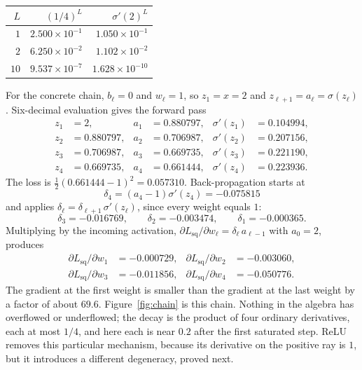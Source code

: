 \begin{center}
\label{tab:powers}
\vspace{0.4em}
\begin{tabular}{@{}rrr@{}}
\toprule
\(L\) & \((1/4)^L\) & \(\sigma'(2)^L\) \\
\midrule
\(1\)  & \(2.500\times 10^{-1}\) & \(1.050\times 10^{-1}\) \\
\(2\)  & \(6.250\times 10^{-2}\) & \(1.102\times 10^{-2}\) \\
\(10\) & \(9.537\times 10^{-7}\) & \(1.628\times 10^{-10}\) \\
\bottomrule
\end{tabular}
\end{center}

For the concrete chain, \(b_\ell=0\) and \(w_\ell=1\), so \(z_1=x=2\) and \(z_{\ell+1}=a_\ell=\sigma(z_\ell)\). Six-decimal evaluation gives the forward pass
\begin{align*}
  z_1 &= 2,        & a_1 &= 0.880797, & \sigma'(z_1) &= 0.104994,\\
  z_2 &= 0.880797, & a_2 &= 0.706987, & \sigma'(z_2) &= 0.207156,\\
  z_3 &= 0.706987, & a_3 &= 0.669735, & \sigma'(z_3) &= 0.221190,\\
  z_4 &= 0.669735, & a_4 &= 0.661444, & \sigma'(z_4) &= 0.223936.
\end{align*}
The loss is \(\tfrac12(0.661444-1)^2 = 0.057310\). Back-propagation starts at
\[
  \delta_4 = (a_4-1)\sigma'(z_4) = -0.075815
\]
and applies \(\delta_\ell = \delta_{\ell+1}\,\sigma'(z_\ell)\), since every weight equals \(1\):
\[
  \delta_3 = -0.016769,
  \qquad
  \delta_2 = -0.003474,
  \qquad
  \delta_1 = -0.000365.
\]
Multiplying by the incoming activation, \(\partial L_{\mathrm{sq}}/\partial w_\ell = \delta_\ell\, a_{\ell-1}\) with \(a_0=2\), produces
\begin{equation*}
\begin{aligned}
  \partial L_{\mathrm{sq}}/\partial w_1 &= -0.000729, &
  \partial L_{\mathrm{sq}}/\partial w_2 &= -0.003060,\\
  \partial L_{\mathrm{sq}}/\partial w_3 &= -0.011856, &
  \partial L_{\mathrm{sq}}/\partial w_4 &= -0.050776.
\end{aligned}
\end{equation*}
The gradient at the first weight is smaller than the gradient at the last weight by a factor of about \(69.6\). Figure~\ref{fig:chain} is this chain. Nothing in the algebra has overflowed or underflowed; the decay is the product of four ordinary derivatives, each at most \(1/4\), and here each is near \(0.2\) after the first saturated step. ReLU removes this particular mechanism, because its derivative on the positive ray is \(1\), but it introduces a different degeneracy, proved next.

